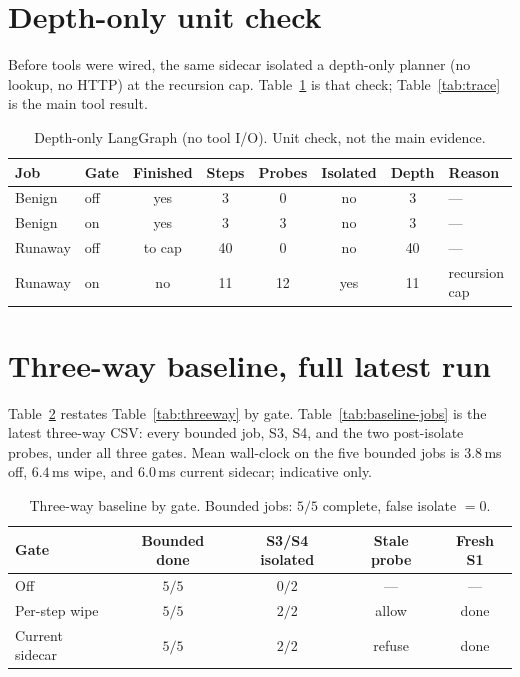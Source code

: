 \documentclass[11pt,a4paper]{article}
\begin{document}
\section{Depth-only unit check}
\label{app:synth-depth}

Before tools were wired, the same sidecar isolated a depth-only planner (no lookup, no HTTP) at the recursion cap.
Table~\ref{tab:synth-depth} is that check; Table~\ref{tab:trace} is the main tool result.

\begin{table}[htbp]
\centering
\caption{Depth-only LangGraph (no tool I/O). Unit check, not the main evidence.}
\label{tab:synth-depth}
{\small
\begin{tabular}{@{}llcccccl@{}}
\toprule
Job & Gate & Finished & Steps & Probes & Isolated & Depth & Reason \\
\midrule
Benign & off & yes & 3 & 0 & no & 3 & --- \\
Benign & on & yes & 3 & 3 & no & 3 & --- \\
Runaway & off & to cap & 40 & 0 & no & 40 & --- \\
Runaway & on & no & 11 & 12 & yes & 11 & recursion cap \\
\bottomrule
\end{tabular}
}
\end{table}

\section{Three-way baseline, full latest run}
\label{app:baseline}

Table~\ref{tab:baseline} restates Table~\ref{tab:threeway} by gate.
Table~\ref{tab:baseline-jobs} is the latest three-way CSV: every bounded job, S3, S4, and the two post-isolate probes, under all three gates.
Mean wall-clock on the five bounded jobs is $3.8$\,ms off, $6.4$\,ms wipe, and $6.0$\,ms current sidecar; indicative only.

\begin{table}[htbp]
\centering
\caption{Three-way baseline by gate. Bounded jobs: $5/5$ complete, false isolate $=0$.}
\label{tab:baseline}
\begin{tabular}{@{}lcccc@{}}
\toprule
Gate & Bounded done & S3/S4 isolated & Stale probe & Fresh S1 \\
\midrule
Off & $5/5$ & $0/2$ & --- & --- \\
Per-step wipe & $5/5$ & $2/2$ & allow & done \\
Current sidecar & $5/5$ & $2/2$ & refuse & done \\
\bottomrule
\end{tabular}
\end{table}
\end{document}

